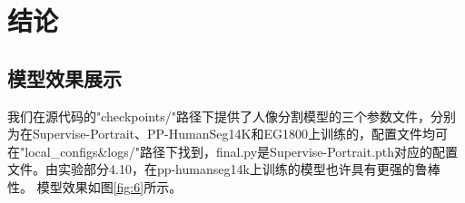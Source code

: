 \documentclass[11pt]{article}
\begin{document}
\section{结论}
\subsection{模型效果展示}
我们在源代码的"checkpoints/"路径下提供了人像分割模型的三个参数文件，分别为在Supervise-Portrait、PP-HumanSeg14K和EG1800上训练的，配置文件均可在"local_configs\&logs/"路径下找到，final.py是Supervise-Portrait.pth对应的配置文件。由实验部分4.10，在pp-humanseg14k上训练的模型也许具有更强的鲁棒性。
模型效果如图\ref{fig:6}所示。
\begin{figure}[!h]
  \centering
\end{figure}
\end{document}
